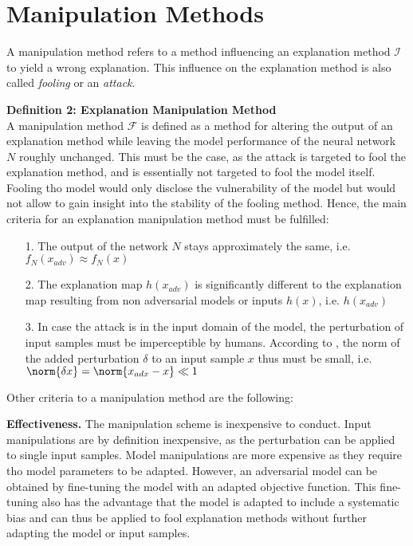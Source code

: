 \section{Manipulation Methods}
\label{sec:manipulation_methods}

A manipulation method refers to a method influencing an explanation method $\mathcal{I}$ to yield a wrong explanation. This influence on the explanation method is also called \textit{fooling} or an \textit{attack}.

\textbf{Definition 2: Explanation Manipulation Method}\\
A manipulation method $\mathcal{F}$ is defined as a method for altering the output of an explanation method while leaving the model performance of the neural network $N$ roughly unchanged. 
This must be the case, as the attack is targeted to fool the explanation method, and is essentially not targeted to fool the model itself. Fooling tho model would only disclose the vulnerability of the model but would not allow to gain insight into the stability of the fooling method. 
Hence, the main criteria for an explanation manipulation method must be fulfilled: 
\begin{enumerate}
    \item[1.] The output of the network $N$ stays approximately the same, i.e. $f_N(x_{adv}) \approx f_N(x)$
    \item[2.] The explanation map $h(x_{adv})$ is significantly different to the explanation map resulting from non adversarial models or inputs $h(x)$, i.e.  $h(x_{adv})$ 
    \item[3.] In case the attack is in the input domain of the model, the perturbation of input samples must be imperceptible by humans. According to \cite{dombrowski2019explanations}, the norm of the added perturbation $\delta$ to an input sample $x$ thus must be small, i.e. $\norm{\delta x} = \norm{x_{adx}-x} \ll 1$
\end{enumerate}

Other criteria to a manipulation method are the following:

\noindent\textbf{Effectiveness.} The manipulation scheme is inexpensive to conduct. Input manipulations are by definition inexpensive, as the perturbation can be applied to single input samples. Model manipulations are more expensive as they require tho model parameters to be adapted. However, an adversarial model can be obtained by fine-tuning the model with an adapted objective function. This fine-tuning also has the advantage that the model is adapted to include a systematic bias and can thus be applied to fool explanation methods without further adapting the model or input samples.

